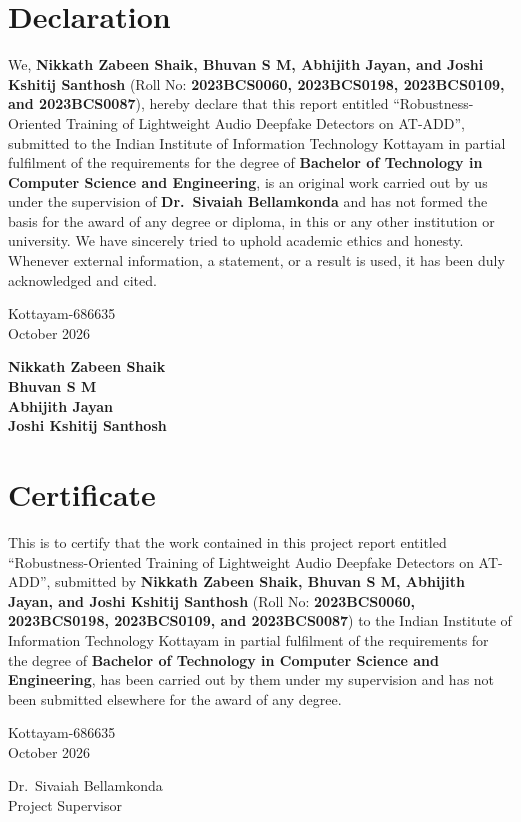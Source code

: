 \documentclass[12pt,a4paper]{report}
\newcommand{\StudentNames}{Nikkath Zabeen Shaik, Bhuvan S M, Abhijith Jayan, and Joshi Kshitij Santhosh}
\newcommand{\StudentRolls}{2023BCS0060, 2023BCS0198, 2023BCS0109, and 2023BCS0087}
\newcommand{\SupervisorName}{Dr.\ Sivaiah Bellamkonda}
\newcommand{\ProjectTitle}{Robustness-Oriented Training of Lightweight Audio Deepfake Detectors on AT-ADD}
\newcommand{\DepartmentName}{Computer Science and Engineering}
\newcommand{\SubmissionDate}{October 2026}
\begin{document}
\chapter*{Declaration}
\noindent
We, \textbf{\StudentNames} (Roll No: \textbf{\StudentRolls}), hereby declare that this report entitled ``\ProjectTitle'', submitted to the Indian Institute of Information Technology Kottayam in partial fulfilment of the requirements for the degree of \textbf{Bachelor of Technology in \DepartmentName}, is an original work carried out by us under the supervision of \textbf{\SupervisorName} and has not formed the basis for the award of any degree or diploma, in this or any other institution or university. We have sincerely tried to uphold academic ethics and honesty. Whenever external information, a statement, or a result is used, it has been duly acknowledged and cited.

\vspace{2cm}
\noindent
\begin{minipage}[t]{0.52\textwidth}
Kottayam-686635\\
\SubmissionDate
\end{minipage}%
\hfill
\begin{minipage}[t]{0.45\textwidth}
\raggedleft
\textbf{Nikkath Zabeen Shaik}\\
\textbf{Bhuvan S M}\\
\textbf{Abhijith Jayan}\\
\textbf{Joshi Kshitij Santhosh}
\end{minipage}

\clearpage
\chapter*{Certificate}
\noindent
This is to certify that the work contained in this project report entitled ``\ProjectTitle'', submitted by \textbf{\StudentNames} (Roll No: \textbf{\StudentRolls}) to the Indian Institute of Information Technology Kottayam in partial fulfilment of the requirements for the degree of \textbf{Bachelor of Technology in \DepartmentName}, has been carried out by them under my supervision and has not been submitted elsewhere for the award of any degree.

\vspace{2cm}
\noindent
\begin{minipage}[t]{0.52\textwidth}
Kottayam-686635\\
\SubmissionDate
\end{minipage}%
\hfill
\begin{minipage}[t]{0.45\textwidth}
\raggedleft
\SupervisorName\\
Project Supervisor
\end{minipage}
\end{document}
